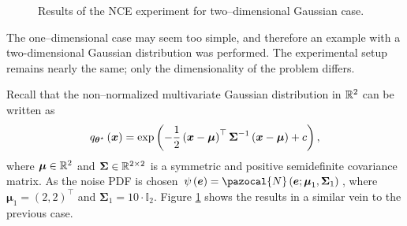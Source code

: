 \begin{example}
\begin{figure}[h]
	\centering
	\caption{Results of the NCE experiment for two--dimensional Gaussian case.}%
	\label{ex:NCE_2}%
\end{figure}

The one--dimensional case may seem too simple, and therefore an example with a two-dimensional Gaussian distribution was performed. The experimental setup remains nearly the same; only the dimensionality of the problem differs. 

Recall that the non--normalized multivariate Gaussian distribution in $\mathbb{R}^2$ can be written as
\begin{equation}
   q_{\boldsymbol{\theta}^\star}\left(\boldsymbol{x}\right) = \exp\left(-\frac{1}{2}\left(\boldsymbol{x} - \boldsymbol{\mu}\right)^\top\boldsymbol{\Sigma}^{-1}\left(\boldsymbol{x} - \boldsymbol{\mu}\right)+ c \right),
\end{equation}
where $\boldsymbol{\mu} \in \mathbb{R}^2$ and $\boldsymbol{\Sigma}\in \mathbb{R}^{2\times 2}$ is a symmetric and positive semidefinite covariance matrix. As the noise PDF is chosen 
$\psi\left(\boldsymbol{e}\right)=\pazocal{N}\left(\boldsymbol{e}; \boldsymbol{\mu}_1,\boldsymbol{\Sigma}_1\right)$, where $\boldsymbol{\mu}_1 = \left(2,2\right)^\top$ and $\boldsymbol{\Sigma}_1=10\cdot\mathbb{I}_2$. Figure \ref{ex:NCE_2} shows the results in a similar vein to the previous case.
\end{example}
